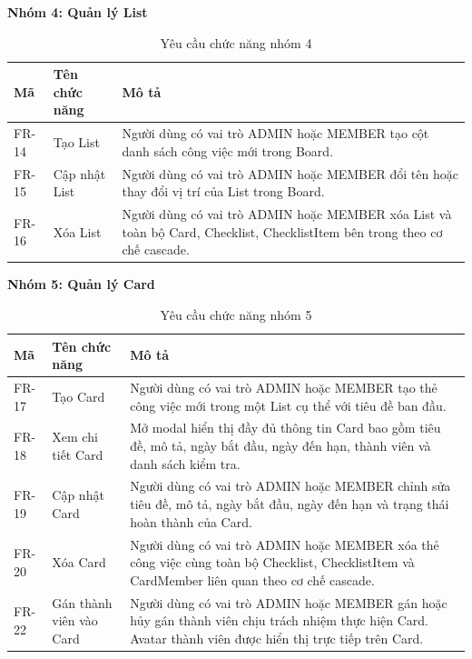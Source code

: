 \textbf{Nhóm 4: Quản lý List}

\begin{table}[H]
\centering
\begin{tabular}{|p{1.8cm}|p{4cm}|p{8.2cm}|}
\hline
\textbf{Mã} & \textbf{Tên chức năng} & \textbf{Mô tả} \\
\hline
FR-14 & Tạo List & Người dùng có vai trò ADMIN hoặc MEMBER tạo cột danh sách công việc mới trong Board. \\
\hline
FR-15 & Cập nhật List & Người dùng có vai trò ADMIN hoặc MEMBER đổi tên hoặc thay đổi vị trí của List trong Board. \\
\hline
FR-16 & Xóa List & Người dùng có vai trò ADMIN hoặc MEMBER xóa List và toàn bộ Card, Checklist, ChecklistItem bên trong theo cơ chế cascade. \\
\hline
\end{tabular}
\caption{Yêu cầu chức năng nhóm 4}
\label{tab:fr_list}
\end{table}

\textbf{Nhóm 5: Quản lý Card}

\begin{table}[H]
\centering
\begin{tabular}{|p{1.8cm}|p{4cm}|p{8.2cm}|}
\hline
\textbf{Mã} & \textbf{Tên chức năng} & \textbf{Mô tả} \\
\hline
FR-17 & Tạo Card & Người dùng có vai trò ADMIN hoặc MEMBER tạo thẻ công việc mới trong một List cụ thể với tiêu đề ban đầu. \\
\hline
FR-18 & Xem chi tiết Card & Mở modal hiển thị đầy đủ thông tin Card bao gồm tiêu đề, mô tả, ngày bắt đầu, ngày đến hạn, thành viên và danh sách kiểm tra. \\
\hline
FR-19 & Cập nhật Card & Người dùng có vai trò ADMIN hoặc MEMBER chỉnh sửa tiêu đề, mô tả, ngày bắt đầu, ngày đến hạn và trạng thái hoàn thành của Card. \\
\hline
FR-20 & Xóa Card & Người dùng có vai trò ADMIN hoặc MEMBER xóa thẻ công việc cùng toàn bộ Checklist, ChecklistItem và CardMember liên quan theo cơ chế cascade. \\
\hline
FR-22 & Gán thành viên vào Card & Người dùng có vai trò ADMIN hoặc MEMBER gán hoặc hủy gán thành viên chịu trách nhiệm thực hiện Card. Avatar thành viên được hiển thị trực tiếp trên Card. \\
\hline
\end{tabular}
\caption{Yêu cầu chức năng nhóm 5}
\label{tab:fr_card}
\end{table}

